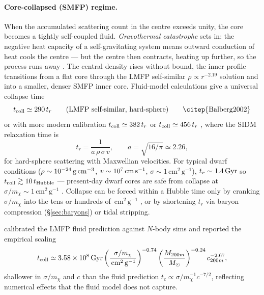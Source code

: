 \documentclass[12pt]{article}
\newcommand{\cmg}{\,\mathrm{cm^2\,g^{-1}}}
\newcommand{\smx}{\sigma/m_\chi}
\begin{document}
\paragraph{Core-collapsed (SMFP) regime.}  When the accumulated
scattering count in the centre exceeds unity, the core becomes a
tightly self-coupled fluid.  \emph{Gravothermal catastrophe} sets in:
the negative heat capacity of a self-gravitating system means outward
conduction of heat cools the centre --- but the centre then contracts,
heating up further, so the process runs away
\citep{Balberg2002}.  The central density rises without bound, the
inner profile transitions from a flat core through the LMFP
self-similar $\rho\propto r^{-2.19}$ solution and into a smaller,
denser SMFP inner core.  Fluid-model calculations give a universal
collapse time
%
\begin{equation}
  t_{\rm coll} \simeq 290\,t_r
  \qquad\text{(LMFP self-similar, hard-sphere)}
  \qquad\text{\citep{Balberg2002}}
  \label{eq:tcoll_290}
\end{equation}
%
or with more modern calibration
$t_{\rm coll} \simeq 382\,t_r$ \citep{Meshveliani2023}
or
$t_{\rm coll} \simeq 456\,t_r$ \citep{Pollack2015},
where the SIDM relaxation time is
%
\begin{equation}
  t_r = \frac{1}{a\,\rho\,\sigma\,v},
  \qquad
  a = \sqrt{16/\pi}\simeq 2.26,
  \label{eq:tr_def}
\end{equation}
%
for hard-sphere scattering with Maxwellian velocities.  For typical
dwarf conditions ($\rho\sim 10^{-24}\,{\rm g\,cm^{-3}}$, $v\sim
10^7\,{\rm cm\,s^{-1}}$, $\sigma\sim 1\cmg$), $t_r\sim 1.4\,{\rm Gyr}$
so $t_{\rm coll}\gtrsim 10\,t_{\rm Hubble}$ --- present-day dwarf cores
are safe from collapse at $\smx\sim 1\cmg$
\citep{Balberg2002}.  Collapse can be forced within a Hubble time only
by cranking $\smx$ into the tens or hundreds of $\cmg$
\citep{Correa2021,Meshveliani2023}, or by shortening $t_r$ via baryon
compression (\S\ref{sec:baryons}) or tidal stripping.

\citet{Zeng2022} calibrated the LMFP fluid prediction against
$N$-body sims and reported the empirical scaling
%
\begin{equation}
  t_{\rm coll} \simeq 3.58\times 10^{8}\,{\rm Gyr}
    \left(\frac{\smx}{\cmg}\right)^{-0.74}
    \left(\frac{M_{200m}}{M_\odot}\right)^{-0.24}
    c_{200m}^{-2.67},
  \label{eq:zeng_tcoll}
\end{equation}
%
shallower in $\smx$ and $c$ than the fluid prediction
$t_c\propto\smx^{-1}c^{-7/2}$, reflecting numerical effects that the
fluid model does not capture.
\end{document}
